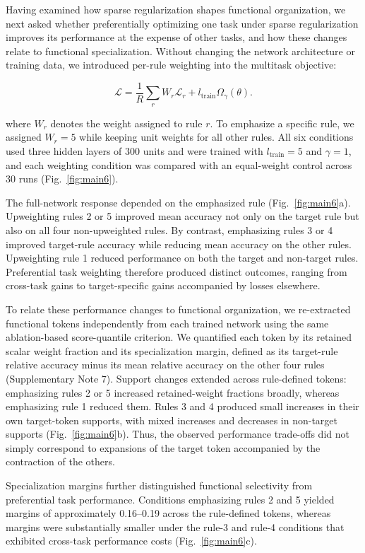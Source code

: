 \documentclass{article}
\begin{document}
Having examined how sparse regularization shapes functional organization, we next asked whether preferentially optimizing one task under sparse regularization improves its performance at the expense of other tasks, and how these changes relate to functional specialization. Without changing the network architecture or training data, we introduced per-rule weighting into the multitask objective:

\[\mathcal{L}=\frac{1}{R}\sum_r W_r\mathcal{L}_r+l_{\mathrm{train}}\Omega_\gamma(\theta).\]

where ${W}_{r}$ denotes the weight assigned to rule $r$. To emphasize a specific rule, we assigned ${W}_{r}=5$ while keeping unit weights for all other rules. All six conditions used three hidden layers of 300 units and were trained with $l_{\mathrm{train}}=5$ and $\gamma=1$, and each weighting condition was compared with an equal-weight control across 30 runs (Fig.~\ref{fig:main6}).

The full-network response depended on the emphasized rule (Fig.~\ref{fig:main6}a). Upweighting rules 2 or 5 improved mean accuracy not only on the target rule but also on all four non-upweighted rules. By contrast, emphasizing rules 3 or 4 improved target-rule accuracy while reducing mean accuracy on the other rules. Upweighting rule 1 reduced performance on both the target and non-target rules. Preferential task weighting therefore produced distinct outcomes, ranging from cross-task gains to target-specific gains accompanied by losses elsewhere.

To relate these performance changes to functional organization, we re-extracted functional tokens independently from each trained network using the same ablation-based score-quantile criterion. We quantified each token by its retained scalar weight fraction and its specialization margin, defined as its target-rule relative accuracy minus its mean relative accuracy on the other four rules (Supplementary Note 7). Support changes extended across rule-defined tokens: emphasizing rules 2 or 5 increased retained-weight fractions broadly, whereas emphasizing rule 1 reduced them. Rules 3 and 4 produced small increases in their own target-token supports, with mixed increases and decreases in non-target supports (Fig.~\ref{fig:main6}b). Thus, the observed performance trade-offs did not simply correspond to expansions of the target token accompanied by the contraction of the others.

Specialization margins further distinguished functional selectivity from preferential task performance. Conditions emphasizing rules 2 and 5 yielded margins of approximately 0.16--0.19 across the rule-defined tokens, whereas margins were substantially smaller under the rule-3 and rule-4 conditions that exhibited cross-task performance costs (Fig.~\ref{fig:main6}c).
\end{document}
